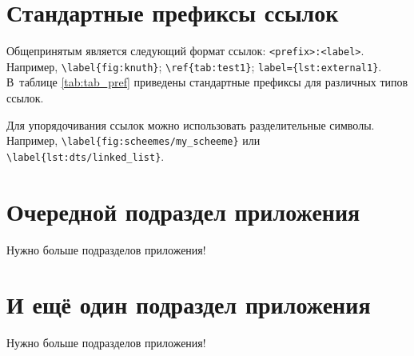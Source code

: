 \section{Стандартные префиксы ссылок}\label{app:B4}

Общепринятым является следующий формат ссылок: \texttt{<prefix>:<label>}.
Например, \verb+\label{fig:knuth}+; \verb+\ref{tab:test1}+; \verb+label={lst:external1}+.
В~таблице \cref{tab:tab_pref} приведены стандартные префиксы для различных
типов ссылок.

\begin{table}[htbp]
    \captionsetup{justification=centering}
\end{table}


Для упорядочивания ссылок можно использовать разделительные символы.
Например, \verb+\label{fig:scheemes/my_scheeme}+ или \\ \verb+\label{lst:dts/linked_list}+.

\section{Очередной подраздел приложения}\label{app:B5}

Нужно больше подразделов приложения!

\section{И ещё один подраздел приложения}\label{app:B6}

Нужно больше подразделов приложения!

\clearpage
{}


